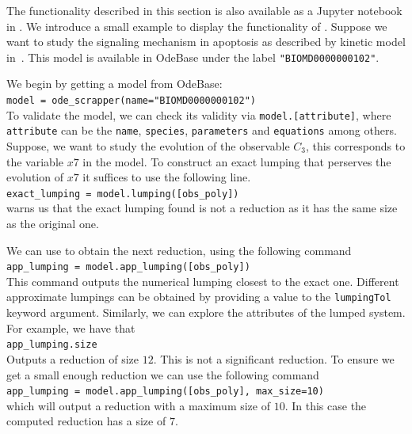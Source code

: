 The functionality described in this section is also available as a Jupyter notebook in \RepoURL.
We introduce a small example to display the functionality of \ToolName.
Suppose we want to study the signaling mechanism in apoptosis as described by kinetic model in~\cite{legewie_mathematical_2006}. 
This model is available in OdeBase under the label \texttt{"BIOMD0000000102"}.

We begin by getting a model from OdeBase:\\
\texttt{model = ode_scrapper(name="BIOMD0000000102")}\\
To validate the model, we can check its validity via \texttt{model.[attribute]}, where \texttt{attribute} can be the \texttt{name}, \texttt{species}, \texttt{parameters} and \texttt{equations} among others.
Suppose, we want to study the evolution of the observable $C_3$, this corresponds to the variable $x7$ in the model.
To construct an exact lumping that perserves the evolution of $x7$ it suffices to use the following line. \\
\texttt{exact_lumping = model.lumping([obs_poly])}\\
\ToolName warns us that the exact lumping found is not a reduction as it has the same size as the original one. 

We can use \ToolName to obtain the next reduction, using the following command \\
\texttt{app_lumping = model.app_lumping([obs_poly])}\\
This command outputs the numerical lumping closest to the exact one. 
Different approximate lumpings can be obtained by providing a value to the \texttt{lumpingTol} keyword argument.
Similarly, we can explore the attributes of the lumped system.
For example, we have that \\
\texttt{app_lumping.size}\\
Outputs a reduction of size $12$.
This is not a significant reduction. 
To ensure we get a small enough reduction we can use the following command \\
\texttt{app_lumping = model.app_lumping([obs_poly], max_size=10)}\\
which will output a reduction with a maximum size of $10$.
In this case the computed reduction has a size of $7$.

